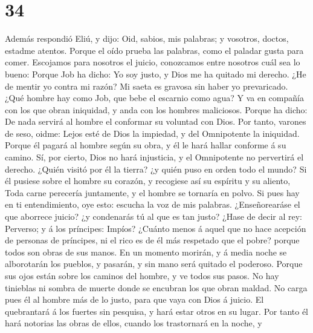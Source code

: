 \hypertarget{section-33}{%
\section{34}\label{section-33}}

 Además respondió Eliú, y dijo:  Oid,
sabios, mis palabras; y vosotros, doctos, estadme atentos.
 Porque el oído prueba las palabras, como el paladar gusta
para comer.  Escojamos para nosotros el juicio, conozcamos
entre nosotros cuál sea lo bueno:  Porque Job ha dicho: Yo
soy justo, y Dios me ha quitado mi derecho.  ¿He de mentir
yo contra mi razón? Mi saeta es gravosa sin haber yo prevaricado.
 ¿Qué hombre hay como Job, que bebe el escarnio como agua?
 Y va en compañía con los que obran iniquidad, y anda con
los hombres maliciosos.  Porque ha dicho: De nada servirá
al hombre el conformar su voluntad con Dios.  Por tanto,
varones de seso, oidme: Lejos esté de Dios la impiedad, y del
Omnipotente la iniquidad.  Porque él pagará al hombre
según su obra, y él le hará hallar conforme á su camino. 
Sí, por cierto, Dios no hará injusticia, y el Omnipotente no pervertirá
el derecho.  ¿Quién visitó por él la tierra? ¿y quién
puso en orden todo el mundo?  Si él pusiese sobre el
hombre su corazón, y recogiese así su espíritu y su aliento,
 Toda carne perecería juntamente, y el hombre se tornaría
en polvo.  Si pues hay en ti entendimiento, oye esto:
escucha la voz de mis palabras.  ¿Enseñorearáse el que
aborrece juicio? ¿y condenarás tú al que es tan justo? 
¿Hase de decir al rey: Perverso; y á los príncipes: Impíos?
 ¿Cuánto menos á aquel que no hace acepción de personas
de príncipes, ni el rico es de él más respetado que el pobre? porque
todos son obras de sus manos.  En un momento morirán, y á
media noche se alborotarán los pueblos, y pasarán, y sin mano será
quitado el poderoso.  Porque sus ojos están sobre los
caminos del hombre, y ve todos sus pasos.  No hay
tinieblas ni sombra de muerte donde se encubran los que obran maldad.
 No carga pues él al hombre más de lo justo, para que
vaya con Dios á juicio.  El quebrantará á los fuertes sin
pesquisa, y hará estar otros en su lugar.  Por tanto él
hará notorias las obras de ellos, cuando los trastornará en la noche, y
